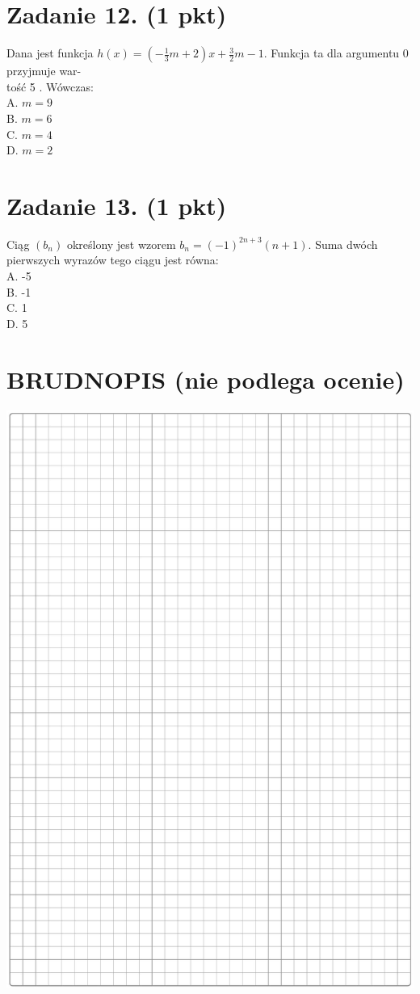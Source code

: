 \documentclass[10pt]{article}
\begin{document}
\section*{Zadanie 12. (1 pkt)}
Dana jest funkcja \(h(x)=\left(-\frac{1}{3} m+2\right) x+\frac{3}{2} m-1\). Funkcja ta dla argumentu 0 przyjmuje war-\\
tość 5 . Wówczas:\\
A. \(m=9\)\\
B. \(m=6\)\\
C. \(m=4\)\\
D. \(m=2\)

\section*{Zadanie 13. (1 pkt)}
Ciąg \(\left(b_{n}\right)\) określony jest wzorem \(b_{n}=(-1)^{2 n+3}(n+1)\). Suma dwóch pierwszych wyrazów tego ciągu jest równa:\\
A. -5\\
B. -1\\
C. 1\\
D. 5

\section*{BRUDNOPIS (nie podlega ocenie)}
\begin{center}
\includegraphics[max width=\textwidth]{2024_11_21_769d5953f978b92e06f5g-05}
\end{center}
\end{document}
